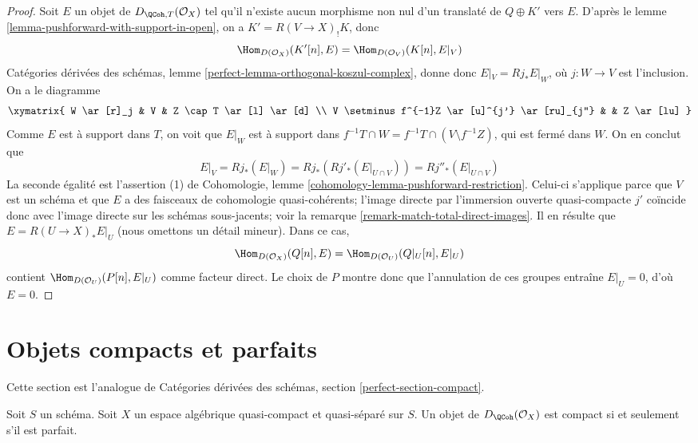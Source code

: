 \begin{proof}
\medskip\noindent
Soit $E$ un objet de $D_{\QCoh,T}(\mathcal{O}_X)$ tel qu'il n'existe aucun
morphisme non nul d'un translat\'e de $Q\oplus K'$ vers $E$. D'apr\`es le lemme
\ref{lemma-pushforward-with-support-in-open}, on a
$K'=R(V\to X)_!K$, donc
$$
\Hom_{D(\mathcal{O}_X)}(K'[n], E) = \Hom_{D(\mathcal{O}_V)}(K[n], E|_V)
$$
Cat\'egories d\'eriv\'ees des sch\'emas, lemme
\ref{perfect-lemma-orthogonal-koszul-complex}, donne donc
$E|_V=Rj_*E|_W$, o\`u $j:W\to V$ est l'inclusion. On a le diagramme
$$
\xymatrix{
W \ar[r]_j & V & Z \cap T \ar[l] \ar[d] \\
V \setminus f^{-1}Z \ar[u]^{j'} \ar[ru]_{j''} & & Z \ar[lu]
}
$$
Comme $E$ est \`a support dans $T$, on voit que $E|_W$ est \`a support dans
$f^{-1}T\cap W=f^{-1}T\cap(V\setminus f^{-1}Z)$, qui est ferm\'e dans $W$.
On en conclut que
$$
E|_V = Rj_*(E|_W) = Rj_*(Rj'_*(E|_{U \cap V})) =
Rj''_*(E|_{U \cap V})
$$
La seconde \'egalit\'e est l'assertion (1) de Cohomologie, lemme
\ref{cohomology-lemma-pushforward-restriction}. Celui-ci s'applique parce que
$V$ est un sch\'ema et que $E$ a des faisceaux de cohomologie quasi-coh\'erents;
l'image directe par l'immersion ouverte quasi-compacte $j'$ co\"incide donc
avec l'image directe sur les sch\'emas sous-jacents; voir la remarque
\ref{remark-match-total-direct-images}. Il en r\'esulte que
$E=R(U\to X)_*E|_U$ (nous omettons un d\'etail mineur). Dans ce cas,
$$
\Hom_{D(\mathcal{O}_X)}(Q[n], E) = \Hom_{D(\mathcal{O}_U)}(Q|_U[n], E|_U)
$$
contient $\Hom_{D(\mathcal{O}_U)}(P[n],E|_U)$ comme facteur direct. Le choix
de $P$ montre donc que l'annulation de ces groupes entra\^ine $E|_U=0$, d'o\`u
$E=0$.
\end{proof}










\section{Objets compacts et parfaits}
\label{section-compact}

\noindent
Cette section est l'analogue de
Cat\'egories d\'eriv\'ees des sch\'emas, section \ref{perfect-section-compact}.

\begin{proposition}
\label{proposition-compact-is-perfect}
Soit $S$ un sch\'ema.
Soit $X$ un espace alg\'ebrique quasi-compact et quasi-s\'epar\'e sur $S$.
Un objet de $D_\QCoh(\mathcal{O}_X)$ est compact
si et seulement s'il est parfait.
\end{proposition}

